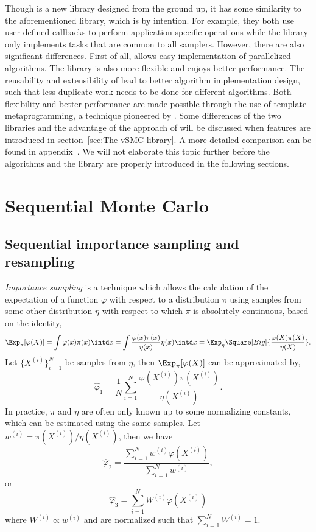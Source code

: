 \documentclass[11pt, bib, hyper, mint, minted=cache]{marticle}
\begin{document}
Though \vsmc is a new library designed from the ground up, it has some
similarity to the aforementioned \lsmctc library, which is by intention. For
example, they both use user defined callbacks to perform application specific
operations while the library only implements tasks that are common to all
samplers. However, there are also significant differences. First of all, \vsmc
allows easy implementation of parallelized algorithms. The library is also
more flexible and enjoys better performance. The reusability and extensibility
of \vsmc lead to better algorithm implementation design, such that less
duplicate work needs to be done for different algorithms. Both flexibility and
better performance are made possible through the use of template
metaprogramming, a technique pioneered by \fblitz. Some differences of the two
libraries and the advantage of the approach of \vsmc will be discussed when
features are introduced in section~\ref{sec:The vSMC library}. A more detailed
comparison can be found in appendix~. We will not
elaborate this topic further before the \smc algorithms and the library are
properly introduced in the following sections.

\section{Sequential Monte Carlo}
\label{sec:Sequential Monte Carlo}

\subsection{Sequential importance sampling and resampling}
\label{sub:Sequential importance sampling and resampling}

\emph{Importance sampling} is a technique which allows the calculation of the
expectation of a function $\varphi$ with respect to a distribution $\pi$ using
samples from some other distribution $\eta$ with respect to which $\pi$ is
absolutely continuous, based on the identity,
\begin{equation}
  \Exp_{\pi}[\varphi(X)]
  = \int\varphi(x)\pi(x)\intd x
  = \int\frac{\varphi(x)\pi(x)}{\eta(x)}\eta(x)\intd x
  = \Exp_{\eta}\Square[Big]{\frac{\varphi(X)\pi(X)}{\eta(X)}}.
\end{equation}
Let $\{X^{(i)}\}_{i=1}^N$ be samples from $\eta$, then
$\Exp_{\pi}[\varphi(X)]$ can be approximated by,
\begin{equation}
  \hat\varphi_1 =
  \frac{1}{N}\sum_{i=1}^N\frac{\varphi(X^{(i)})\pi(X^{(i)})}{\eta(X^{(i)})}.
\end{equation}
In practice, $\pi$ and $\eta$ are often only known up to some normalizing
constants, which can be estimated using the same samples. Let $w^{(i)} =
\pi(X^{(i)})/\eta(X^{(i)})$, then we have
\begin{equation}
  \hat\varphi_2 =
  \frac{\sum_{i=1}^Nw^{(i)}\varphi(X^{(i)})}{\sum_{i=1}^Nw^{(i)}},
\end{equation}
or
\begin{equation}
  \hat\varphi_3 = \sum_{i=1}^NW^{(i)}\varphi(X^{(i)})
\end{equation}
where $W^{(i)}\propto w^{(i)}$ and are normalized such that $\sum_{i=1}^N
W^{(i)} = 1$.
\end{document}
